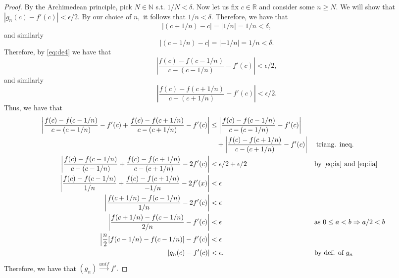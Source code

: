 \documentclass[10pt]{article}
\begin{document}
\begin{proof}
    By the Archimedean principle, pick $N\in\mathbb{N}$ s.t. $1/N < \delta.$ Now let us fix $c \in\mathbb{R}$ and consider some  $n\ge N.$ We will show that $|g_n(c)-f'(c)|<\epsilon/2.$ By our choice of $n,$ it follows that $1/n < \delta.$ Therefore, we have that
    \[|(c+1/n) -c| = |1/n| = 1/n<\delta,\]
    and similarly
    \[|(c-1/n) -c| =  \left |-1/n\right | = 1/n <\delta.\]
    Therefore, by \eqref{eq:de4} we have that
    \begin{equation} \label{eq:ia}
        \left|\frac{f(c)-f(c-1/n)}{c-(c-1/n)} - f'(c)\right|< \epsilon / 2,
    \end{equation}
    and similarly
    \begin{equation} \label{eq:iia}
        \left|\frac{f(c)-f(c+1/n)}{c-(c+1/n)} - f'(c)\right|< \epsilon / 2.
    \end{equation}
    Thus, we have that
    \begin{alignat*}{2}
        \left|\frac{f(c)-f(c-1/n)}{c-(c-1/n)} -f'(c) + \frac{f(c)-f(c+1/n)}{c-(c+1/n)} - f'(c)\right| &\le \left|\frac{f(c)-f(c-1/n)}{c-(c-1/n)} - f'(c)\right|\\
        &\quad+  \left|\frac{f(c)-f(c+1/n)}{c-(c+1/n)} - f'(c)\right| &&\;\text{triang. ineq.}\\
        \left|\frac{f(c)-f(c-1/n)}{c-(c-1/n)} + \frac{f(c)-f(c+1/n)}{c-(c+1/n)} -2f'(c)\right|&< \epsilon/2 + \epsilon/2 && \text{by \eqref{eq:ia} and \eqref{eq:iia}}\\
        \left |\frac{f(c)-f(c-1/n)}{1/n} + \frac{f(c)-f(c+1/n)}{-1/n} -2f'(x)\right | &< \epsilon\\
        \left| \frac{f(c+1/n)-f(c-1/n)}{1/n} -2f'(c)\right | &<\epsilon\\
        \left| \frac{f(c+1/n)-f(c-1/n)}{2/n} -f'(c)\right | &<\epsilon \qquad&&\text{as $0\le a<b\Rightarrow a/2<b$}\\
        \left| \frac{n}{2}[f(c+1/n)-f(c-1/n)]-f'(c)\right | &<\epsilon\\
        |g_n(c)-f'(c)| &<\epsilon. &&\text{by def. of $g_n$} 
    \end{alignat*}
    Therefore, we have that $(g_n)\stackrel{unif}{\to}f'.$
\end{proof}
\end{document}

